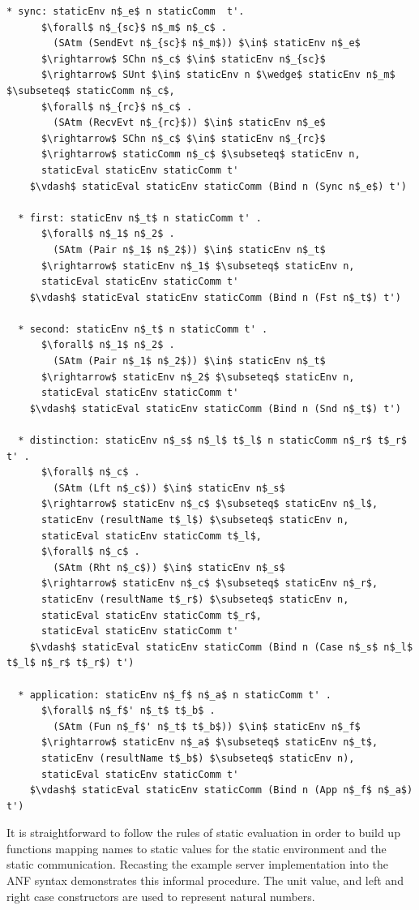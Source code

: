 \documentclass[letterpaper, 11pt]{report}
\begin{document}
\begin{lstlisting}[language=logic, mathescape]
  * sync: staticEnv n$_e$ n staticComm  t'.
      $\forall$ n$_{sc}$ n$_m$ n$_c$ . 
        (SAtm (SendEvt n$_{sc}$ n$_m$)) $\in$ staticEnv n$_e$
      $\rightarrow$ SChn n$_c$ $\in$ staticEnv n$_{sc}$ 
      $\rightarrow$ SUnt $\in$ staticEnv n $\wedge$ staticEnv n$_m$ $\subseteq$ staticComm n$_c$,
      $\forall$ n$_{rc}$ n$_c$ . 
        (SAtm (RecvEvt n$_{rc}$)) $\in$ staticEnv n$_e$
      $\rightarrow$ SChn n$_c$ $\in$ staticEnv n$_{rc}$ 
      $\rightarrow$ staticComm n$_c$ $\subseteq$ staticEnv n,
      staticEval staticEnv staticComm t'
    $\vdash$ staticEval staticEnv staticComm (Bind n (Sync n$_e$) t')

  * first: staticEnv n$_t$ n staticComm t' . 
      $\forall$ n$_1$ n$_2$ .
        (SAtm (Pair n$_1$ n$_2$)) $\in$ staticEnv n$_t$
      $\rightarrow$ staticEnv n$_1$ $\subseteq$ staticEnv n,
      staticEval staticEnv staticComm t'
    $\vdash$ staticEval staticEnv staticComm (Bind n (Fst n$_t$) t')

  * second: staticEnv n$_t$ n staticComm t' . 
      $\forall$ n$_1$ n$_2$ . 
        (SAtm (Pair n$_1$ n$_2$)) $\in$ staticEnv n$_t$
      $\rightarrow$ staticEnv n$_2$ $\subseteq$ staticEnv n,
      staticEval staticEnv staticComm t'
    $\vdash$ staticEval staticEnv staticComm (Bind n (Snd n$_t$) t')

  * distinction: staticEnv n$_s$ n$_l$ t$_l$ n staticComm n$_r$ t$_r$ t' . 
      $\forall$ n$_c$ . 
        (SAtm (Lft n$_c$)) $\in$ staticEnv n$_s$
      $\rightarrow$ staticEnv n$_c$ $\subseteq$ staticEnv n$_l$,
      staticEnv (resultName t$_l$) $\subseteq$ staticEnv n,
      staticEval staticEnv staticComm t$_l$,
      $\forall$ n$_c$ . 
        (SAtm (Rht n$_c$)) $\in$ staticEnv n$_s$
      $\rightarrow$ staticEnv n$_c$ $\subseteq$ staticEnv n$_r$, 
      staticEnv (resultName t$_r$) $\subseteq$ staticEnv n, 
      staticEval staticEnv staticComm t$_r$,
      staticEval staticEnv staticComm t'
    $\vdash$ staticEval staticEnv staticComm (Bind n (Case n$_s$ n$_l$ t$_l$ n$_r$ t$_r$) t')

  * application: staticEnv n$_f$ n$_a$ n staticComm t' . 
      $\forall$ n$_f$' n$_t$ t$_b$ . 
        (SAtm (Fun n$_f$' n$_t$ t$_b$)) $\in$ staticEnv n$_f$
      $\rightarrow$ staticEnv n$_a$ $\subseteq$ staticEnv n$_t$, 
      staticEnv (resultName t$_b$) $\subseteq$ staticEnv n),
      staticEval staticEnv staticComm t'
    $\vdash$ staticEval staticEnv staticComm (Bind n (App n$_f$ n$_a$) t')
\end{lstlisting}

It is straightforward to follow the rules of static evaluation in order to build up
functions mapping names to static values for the static environment
and the static communication.
Recasting the example server implementation into the ANF syntax demonstrates this informal procedure.
The unit value, and left and right case constructors are used to represent natural numbers.
\end{document}
